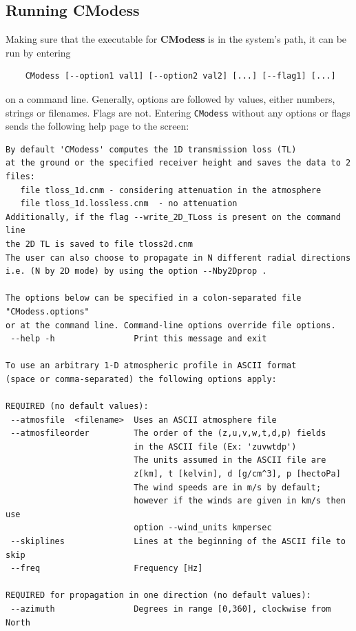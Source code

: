 \subsection{Running CModess}
\label{sec:running cmodess}

Making sure that the executable for {\bf CModess} is in the system's path, it can be run by entering 
\begin{verbatim} 
    CModess [--option1 val1] [--option2 val2] [...] [--flag1] [...] 
\end{verbatim}
on a command line. Generally, options are followed by values, either numbers, strings or filenames. Flags are not. Entering \verb"CModess" without any options or flags sends the following help page to the screen: 

\begin{verbatim}
By default 'CModess' computes the 1D transmission loss (TL)
at the ground or the specified receiver height and saves the data to 2 files:
   file tloss_1d.cnm - considering attenuation in the atmosphere
   file tloss_1d.lossless.cnm  - no attenuation
Additionally, if the flag --write_2D_TLoss is present on the command line
the 2D TL is saved to file tloss2d.cnm
The user can also choose to propagate in N different radial directions
i.e. (N by 2D mode) by using the option --Nby2Dprop .

The options below can be specified in a colon-separated file "CModess.options"
or at the command line. Command-line options override file options.
 --help -h                Print this message and exit

To use an arbitrary 1-D atmospheric profile in ASCII format
(space or comma-separated) the following options apply:

REQUIRED (no default values):
 --atmosfile  <filename>  Uses an ASCII atmosphere file
 --atmosfileorder         The order of the (z,u,v,w,t,d,p) fields
                          in the ASCII file (Ex: 'zuvwtdp')
                          The units assumed in the ASCII file are
                          z[km], t [kelvin], d [g/cm^3], p [hectoPa]
                          The wind speeds are in m/s by default;
                          however if the winds are given in km/s then use
                          option --wind_units kmpersec
 --skiplines              Lines at the beginning of the ASCII file to skip
 --freq                   Frequency [Hz]

REQUIRED for propagation in one direction (no default values):
 --azimuth                Degrees in range [0,360], clockwise from North


\end{verbatim}
